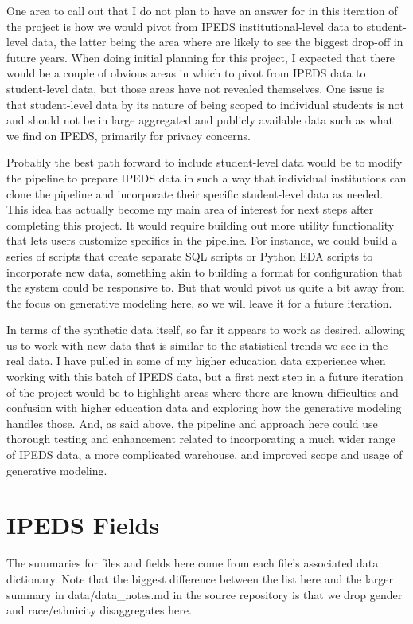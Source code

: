 \documentclass[sigconf, authorversion, nonacm]{acmart}
\begin{document}
    One area to call out that I do not plan to have an answer for in this iteration of the project is how we would pivot from IPEDS institutional-level data to student-level data, the latter being the area where are likely to see the biggest drop-off in future years. When doing initial planning for this project, I expected that there would be a couple of obvious areas in which to pivot from IPEDS data to student-level data, but those areas have not revealed themselves. One issue is that student-level data by its nature of being scoped to individual students is not and should not be in large aggregated and publicly available data such as what we find on IPEDS, primarily for privacy concerns.

    Probably the best path forward to include student-level data would be to modify the pipeline to prepare IPEDS data in such a way that individual institutions can clone the pipeline and incorporate their specific student-level data as needed. This idea has actually become my main area of interest for next steps after completing this project. It would require building out more utility functionality that lets users customize specifics in the pipeline. For instance, we could build a series of scripts that create separate SQL scripts or Python EDA scripts to incorporate new data, something akin to building a format for configuration that the system could be responsive to. But that would pivot us quite a bit away from the focus on generative modeling here, so we will leave it for a future iteration.

    In terms of the synthetic data itself, so far it appears to work as desired, allowing us to work with new data that is similar to the statistical trends we see in the real data. I have pulled in some of my higher education data experience when working with this batch of IPEDS data, but a first next step in a future iteration of the project would be to highlight areas where there are known difficulties and confusion with higher education data and exploring how the generative modeling handles those. And, as said above, the pipeline and approach here could use thorough testing and enhancement related to incorporating a much wider range of IPEDS data, a more complicated warehouse, and improved scope and usage of generative modeling.




\appendix

\section{IPEDS Fields}
    The summaries for files and fields here come from each file's associated data dictionary. Note that the biggest difference between the list here and the larger summary in data/data\_notes.md in the source repository is that we drop gender and race/ethnicity disaggregates here.
\end{document}

